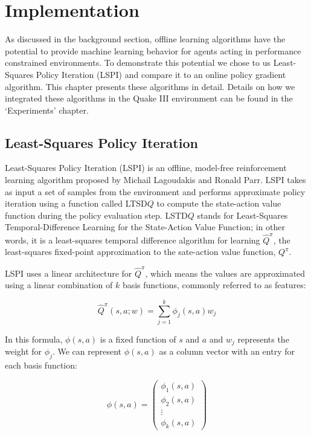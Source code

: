 \chapter{Implementation}

As discussed in the background section, offline learning algorithms have the potential to provide machine learning behavior for agents acting in performance constrained environments. To demonstrate this potential we chose to us Least-Squares Policy Iteration (LSPI) and compare it to an online policy gradient algorithm. This chapter presents these algorithms in detail. Details on how we integrated these algorithms in the Quake III environment can be found in the `Experiments' chapter.

\section{Least-Squares Policy Iteration}

Least-Squares Policy Iteration (LSPI) \cite{lspi} is an offline, model-free reinforcement learning algorithm proposed by Michail Lagoudakis and Ronald Parr. LSPI takes as input a set of samples from the environment and performs approximate policy iteration using a function called LTSD$Q$ to compute the state-action value function during the policy evaluation step. LSTD$Q$ stands for Least-Squares Temporal-Difference Learning for the State-Action Value Function; in other words, it is a least-squares temporal difference algorithm for learning $\hat{Q}^\pi$, the least-squares fixed-point approximation to the sate-action value function, $Q^\pi$.

LSPI uses a linear architecture for $\hat{Q}^\pi$, which means the values are approximated using a linear combination of $k$ basis functions, commonly referred to as features:

\[
    \hat{Q}^\pi(s,a;w) = \sum_{j=1}^k \phi_j(s,a)w_j
\]

In this formula, $\phi(s,a)$ is a fixed function of $s$ and $a$ and $w_j$ represents the weight for $\phi_j$. We can represent $\phi(s,a)$ as a column vector with an entry for each basis function:


\[
    \phi(s,a) = \begin{pmatrix}
       \phi_1(s,a) \\ \phi_2(s,a) \\ \vdots \\ \phi_k(s,a)
    \end{pmatrix}
\]

